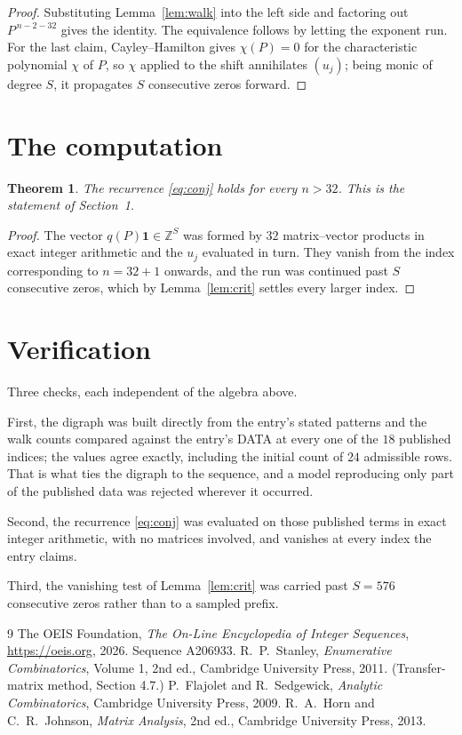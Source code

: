 \documentclass[11pt,a4paper]{article}
\theoremstyle{plain}
\newtheorem{theorem}{Theorem}
\theoremstyle{definition}
\begin{document}
\begin{proof}
Substituting Lemma~\ref{lem:walk} into the left side and factoring out
$P^{\,n-2-32}$ gives the identity. The equivalence follows by letting the exponent
run. For the last claim, Cayley--Hamilton gives $\chi(P)=0$ for the characteristic
polynomial $\chi$ of $P$, so $\chi$ applied to the shift annihilates $(u_j)$; being monic of
degree $S$, it propagates $S$ consecutive zeros forward.
\end{proof}

\section{The computation}

\begin{theorem}
The recurrence \eqref{eq:conj} holds for every $n>32$. This is the statement of
Section~1.
\end{theorem}

\begin{proof}
The vector $q(P)\mathbf{1}\in\mathbb{Z}^{S}$ was formed by $32$ matrix--vector
products in exact integer arithmetic and the $u_j$ evaluated in turn. They vanish from the
index corresponding to $n=32+1$ onwards, and the run was continued past $S$ consecutive
zeros, which by Lemma~\ref{lem:crit} settles every larger index.
\end{proof}

\section{Verification}

Three checks, each independent of the algebra above.

First, the digraph was built directly from the entry's stated patterns and the walk counts
compared against the entry's DATA at every one of the $18$ published indices; the
values agree exactly, including the initial count of $24$ admissible rows. That is
what ties the digraph to the sequence, and a model reproducing only part of the published
data was rejected wherever it occurred.

Second, the recurrence \eqref{eq:conj} was evaluated on those published terms in exact
integer arithmetic, with no matrices involved, and vanishes at every index the entry claims.

Third, the vanishing test of Lemma~\ref{lem:crit} was carried past $S=576$ consecutive
zeros rather than to a sampled prefix.

\begin{thebibliography}{9}
 The OEIS Foundation, \emph{The On-Line Encyclopedia of Integer
Sequences}, \url{https://oeis.org}, 2026. Sequence A206933.
 R.~P.~Stanley, \emph{Enumerative Combinatorics}, Volume 1, 2nd ed.,
Cambridge University Press, 2011. (Transfer-matrix method, Section 4.7.)
 P.~Flajolet and R.~Sedgewick, \emph{Analytic Combinatorics}, Cambridge
University Press, 2009.
 R.~A.~Horn and C.~R.~Johnson, \emph{Matrix Analysis}, 2nd ed., Cambridge
University Press, 2013.
\end{thebibliography}
\end{document}
